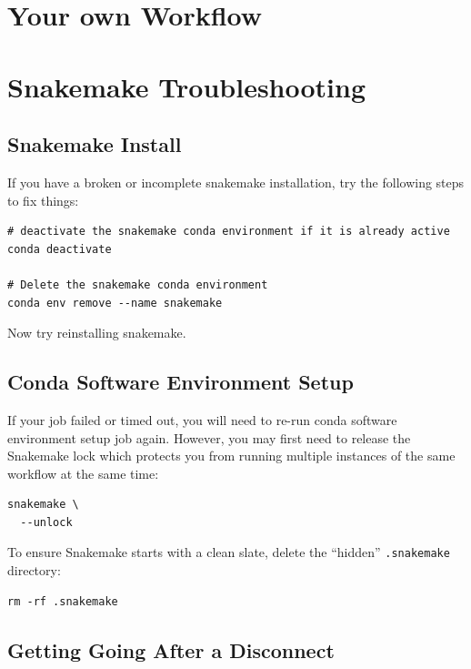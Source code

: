 \section{Your own Workflow}

\section{Snakemake Troubleshooting}
\label{sec:snake_trouble}

\subsection{Snakemake Install}

If you have a broken or incomplete snakemake installation, try the following steps to fix things:

\begin{lstlisting}
# deactivate the snakemake conda environment if it is already active
conda deactivate

# Delete the snakemake conda environment
conda env remove --name snakemake
\end{lstlisting}

Now try reinstalling snakemake.

\subsection{Conda Software Environment Setup}

If your job failed or timed out, you will need to re-run conda software environment setup job again. However, you may first need to release the
Snakemake lock which protects you from running multiple instances of the same workflow at the same time:

\begin{lstlisting}
snakemake \
  --unlock
\end{lstlisting}

To ensure Snakemake starts with a clean slate, delete the ``hidden'' \texttt{.snakemake} directory:

\begin{lstlisting}
rm -rf .snakemake
\end{lstlisting}

\subsection{Getting Going After a Disconnect}

